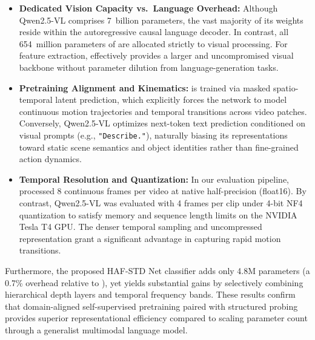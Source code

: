 \begin{itemize}[leftmargin=*]
    \item \textbf{Dedicated Vision Capacity vs.\ Language Overhead:} Although Qwen2.5-VL comprises 7~billion parameters, the vast majority of its weights reside within the autoregressive causal language decoder. In contrast, all 654~million parameters of \vjepaa{} are allocated strictly to visual processing. For feature extraction, \vjepaa{} effectively provides a larger and uncompromised visual backbone without parameter dilution from language-generation tasks.
    \item \textbf{Pretraining Alignment and Kinematics:} \vjepaa{} is trained via masked spatio-temporal latent prediction, which explicitly forces the network to model continuous motion trajectories and temporal transitions across video patches. Conversely, Qwen2.5-VL optimizes next-token text prediction conditioned on visual prompts (e.g., \texttt{"Describe."}), naturally biasing its representations toward static scene semantics and object identities rather than fine-grained action dynamics.
    \item \textbf{Temporal Resolution and Quantization:} In our evaluation pipeline, \vjepaa{} processed 8 continuous frames per video at native half-precision (float16). By contrast, Qwen2.5-VL was evaluated with 4 frames per clip under 4-bit NF4 quantization to satisfy memory and sequence length limits on the NVIDIA Tesla T4 GPU. The denser temporal sampling and uncompressed representation grant \vjepaa{} a significant advantage in capturing rapid motion transitions.
\end{itemize}

Furthermore, the proposed HAF-STD Net classifier adds only 4.8M parameters (a 0.7\% overhead relative to \vjepaa{}), yet yields substantial gains by selectively combining hierarchical depth layers and temporal frequency bands. These results confirm that domain-aligned self-supervised pretraining paired with structured probing provides superior representational efficiency compared to scaling parameter count through a generalist multimodal language model.

